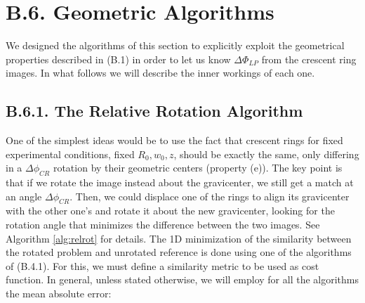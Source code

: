 \documentclass[11pt, a4paper, twoside]{article} %
\begin{document}
\section*{B.6. Geometric Algorithms}
We designed the algorithms of this section to explicitly exploit the geometrical properties described in (B.1) in order to let us know $\Delta\Phi_{LP}$ from the crescent ring images. In what follows we will describe the inner workings of each one.\vspace{-0.35cm}

\subsection*{B.6.1. The Relative Rotation Algorithm \vspace{-0.2cm}}
One of the simplest ideas would be to use the fact that crescent rings for fixed experimental conditions, fixed $R_0,w_0,z$, should be exactly the same, only differing in a $\Delta\phi_{CR}$ rotation by their geometric centers (property (e)). The key point is that if we rotate the image instead about the gravicenter, we still get a match at an angle $\Delta\phi_{CR}$. Then, we could displace one of the rings to align its gravicenter with the other one's and rotate it about the new gravicenter, looking for the rotation angle that minimizes the difference between the two images. See Algorithm \ref{alg:relrot} for details. The 1D minimization of the similarity between the rotated problem and unrotated reference is done using one of the algorithms of (B.4.1). For this, we must define a similarity metric to be used as cost function. In general, unless stated otherwise, we will employ for all the algorithms the mean absolute error:
\end{document}
